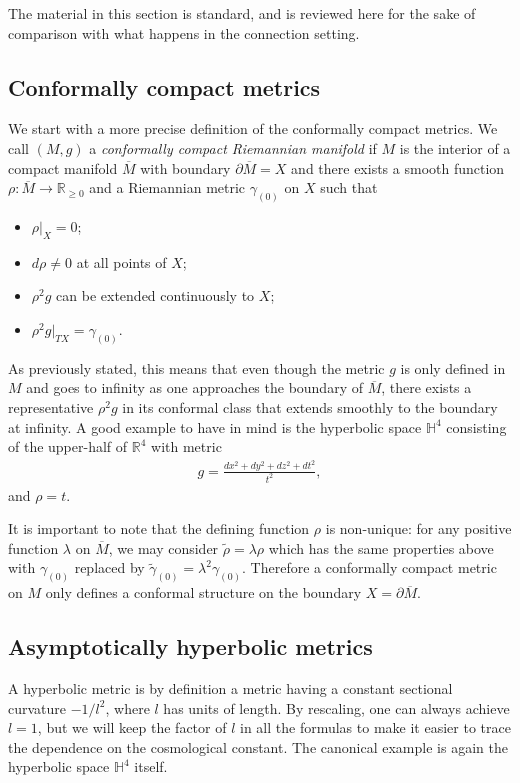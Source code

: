 \documentclass[a4paper,12pt]{article}
\newcommand{\R}{{\mathbb R}}
\newcommand{\Mb}{\overline{M}}
\newcommand{\pa}{\partial}
\newcommand{\be}{\begin{eqnarray}}
\newcommand{\ee}{\end{eqnarray}}
\begin{document}
The material in this section is standard, and is reviewed here for the sake of comparison with what happens in the connection setting. 

\subsection{Conformally compact metrics}

We start with a more precise definition of the conformally compact metrics. We call $(M,g)$ a \emph{conformally compact Riemannian manifold} if $M$ is the interior of a compact manifold $\overline M$ with boundary $\partial\overline M=X$ and there exists a smooth function $\rho:\overline{M}\to\R_{\geq 0}$ and a Riemannian metric $\gamma_{(0)}$ on $X$ such that
\begin{itemize}
	\item $\rho|_{X}=0$;
	\item $d\rho\neq0$ at all points of $X$;
	\item $\rho^2 g$ can be extended continuously to $X$;
	\item $\rho^2 g|_{TX}=\gamma_{(0)}$.
\end{itemize}
As previously stated, this means that even though the metric $g$ is only defined in $M$ and goes to infinity as one approaches the boundary of $\overline M$, there exists a representative $\rho^2 g$ in its conformal class that extends smoothly to the boundary at infinity. A good example to have in mind is the hyperbolic space $\mathbb {H}^4$ consisting of the upper-half of $\R^4$ with metric 
\be
g=\frac{dx^2+dy^2+dz^2+dt^2}{t^2},
\ee 
and $\rho=t$. 

It is important to note that the defining function $\rho$ is non-unique: for any positive function $\lambda$ on $\overline{M}$, we may consider $\tilde\rho=\lambda\rho$ which has the same properties above with $\gamma_{(0)}$ replaced by $\tilde\gamma_{(0)}=\lambda^2\gamma_{(0)}$. Therefore a conformally compact metric on $M$ only defines a conformal structure on the boundary $X=\pa \Mb$. 

\subsection{Asymptotically hyperbolic metrics}

A hyperbolic metric is by definition a metric having a constant sectional curvature $-1/l^2$, where $l$ has units of length. By rescaling, one can always achieve $l=1$, but we will keep the factor of $l$ in all the formulas to make it easier to trace the dependence on the cosmological constant. The canonical example is again the hyperbolic space $\mathbb {H}^4$ itself.
\end{document}
